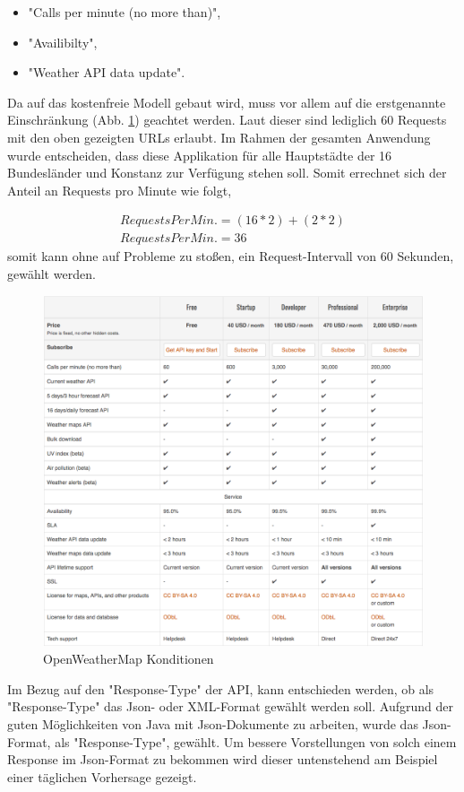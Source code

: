 \begin{itemize}
\item "Calls per minute (no more than)",
\item "Availibilty",
\item "Weather API data update".
\end{itemize}

Da auf das kostenfreie Modell gebaut wird, muss vor allem auf die erstgenannte Einschränkung (Abb. \ref{img:OpenWeather}) geachtet werden. Laut dieser sind lediglich 60 Requests mit den oben gezeigten URLs erlaubt. Im Rahmen der gesamten Anwendung wurde entscheiden, dass diese Applikation für alle Hauptstädte der 16 Bundesländer und Konstanz zur Verfügung stehen soll. Somit errechnet sich der Anteil an Requests pro Minute wie folgt,

\begin{align}
RequestsPerMin. = (16*2)+(2*2)\\
RequestsPerMin. = 36
\end{align}
somit kann ohne auf Probleme zu stoßen, ein Request-Intervall von 60 Sekunden, gewählt werden. 

\begin{figure}[!ht]
	\centering
	\includegraphics[width=1.0\textwidth]{Bilder/OpenWeatherMap.png}
	\caption{OpenWeatherMap Konditionen}
	\label{img:OpenWeather}
\end{figure} 
Im Bezug auf den "Response-Type" der API, kann entschieden werden, ob als "Response-Type" das Json- oder XML-Format gewählt werden soll. Aufgrund der guten Möglichkeiten von Java mit Json-Dokumente zu arbeiten, wurde  das Json-Format, als "Response-Type", gewählt.
Um bessere Vorstellungen von solch einem Response im Json-Format zu bekommen wird dieser untenstehend am Beispiel einer täglichen Vorhersage gezeigt.  

